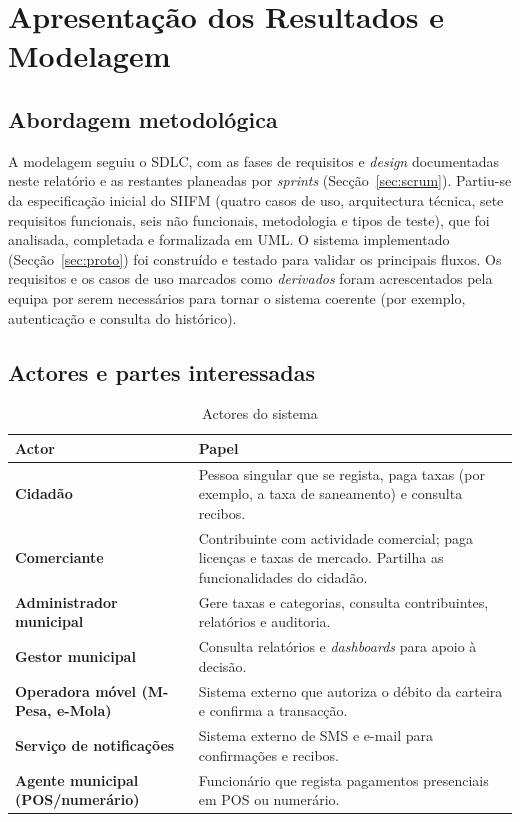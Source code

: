 \documentclass[12pt,a4paper,openany]{report}
\begin{document}
\chapter{Apresentação dos Resultados e Modelagem}

\section{Abordagem metodológica}
A modelagem seguiu o SDLC, com as fases de requisitos e \emph{design} documentadas neste relatório e as restantes planeadas por \emph{sprints} (Secção~\ref{sec:scrum}). Partiu-se da especificação inicial do SIIFM (quatro casos de uso, arquitectura técnica, sete requisitos funcionais, seis não funcionais, metodologia e tipos de teste), que foi analisada, completada e formalizada em UML. O sistema implementado (Secção~\ref{sec:proto}) foi construído e testado para validar os principais fluxos. Os requisitos e os casos de uso marcados como \emph{derivados} foram acrescentados pela equipa por serem necessários para tornar o sistema coerente (por exemplo, autenticação e consulta do histórico).

\section{Actores e partes interessadas}
\begin{table}[!htbp]
\caption{Actores do sistema}\label{tab:actores}
\begingroup\singlespacing\small
\begin{tabularx}{\textwidth}{@{}>{\bfseries}p{3.6cm}X@{}}
\toprule
Actor & Papel \\
\midrule
Cidadão & Pessoa singular que se regista, paga taxas (por exemplo, a taxa de saneamento) e consulta recibos. \\
Comerciante & Contribuinte com actividade comercial; paga licenças e taxas de mercado. Partilha as funcionalidades do cidadão. \\
Administrador municipal & Gere taxas e categorias, consulta contribuintes, relatórios e auditoria. \\
Gestor municipal & Consulta relatórios e \emph{dashboards} para apoio à decisão. \\
Operadora móvel (M-Pesa, e-Mola) & Sistema externo que autoriza o débito da carteira e confirma a transacção. \\
Serviço de notificações & Sistema externo de SMS e e-mail para confirmações e recibos. \\
Agente municipal (POS/numerário) & Funcionário que regista pagamentos presenciais em POS ou numerário. \\
\bottomrule
\end{tabularx}
\endgroup
\end{table}
\end{document}
